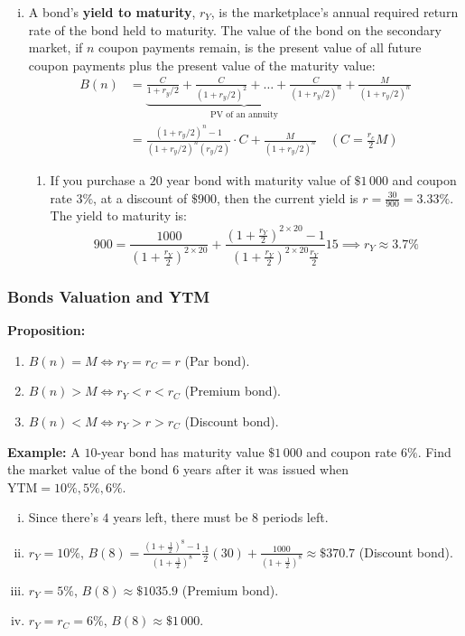\begin{enumerate}[i.]
    \item A bond's \textbf{yield to maturity}, \(r_Y\), is the marketplace's annual required return rate of the bond held to maturity. The value of the bond on the secondary market, if \(n\) coupon payments remain, is the present value of all future coupon payments plus the present value of the maturity value:
    \begin{align*}
        B(n) &= \underbrace{\frac{C}{1 + r_y/2} + \frac{C}{(1 + r_y/2)^2} + \dots + \frac{C}{(1 + r_y/2)^n}}_{\text{PV of an annuity}} + \frac{M}{(1 + r_y/2)^n} \\[1em]
        &= \boxed{\frac{(1 + r_y/2)^n - 1}{(1 + r_y/2)^n (r_y/2)} \cdot C + \frac{M}{(1 + r_y/2)^n}} \quad \left(C = \frac{r_c}{2}M\right)
    \end{align*}
    \begin{enumerate}
        \item If you purchase a \(20\) year bond with maturity value of \(\$1\,000\) and coupon rate \(3\%\), at a discount of \(\$900\), then the current yield is \(r=\frac{30}{900} = 3.33\%\). The yield to maturity is:
        \begin{equation*}
            900 = \frac{1000}{(1+\frac{r_Y}{2})^{2 \times 20}} + \frac{(1+\frac{r_Y}{2})^{2 \times 20} - 1}{(1+\frac{r_Y}{2})^{2 \times 20}\frac{r_Y}{2}}15 \implies r_Y \approx 3.7\%
        \end{equation*}
    \end{enumerate}
\end{enumerate}

\subsubsection{Bonds Valuation and YTM}
\textbf{Proposition: }
\begin{enumerate}
    \item \(B(n) = M \Leftrightarrow r_Y = r_C = r\) (Par bond).
    \item \(B(n) > M \Leftrightarrow r_Y < r < r_C\) (Premium bond).
    \item \(B(n) < M \Leftrightarrow r_Y > r > r_C\) (Discount bond).
\end{enumerate}

\textbf{Example: } A \(10\)-year bond has maturity value \(\$1\,000\) and coupon rate \(6\%\). Find the market value of the bond \(6\) years after it was issued when \(\text{YTM}=10\%, 5\%, 6\%\).
\begin{enumerate}[i.]
    \item Since there's \(4\) years left, there must be \(8\) periods left.

    \item \(r_Y = 10\%\), \(B(8) = \frac{(1+\frac{.1}{2})^8 - 1}{(1+\frac{.1}{2})^8}\frac{.1}{2}(30) + \frac{1000}{(1+\frac{.1}{2})^8} \approx \$370.7\) (Discount bond).

    \item \(r_Y = 5\%\), \(B(8) \approx \$1035.9\) (Premium bond).

    \item \(r_Y = r_C = 6\%\), \(B(8) \approx \$1\,000\).
\end{enumerate}

